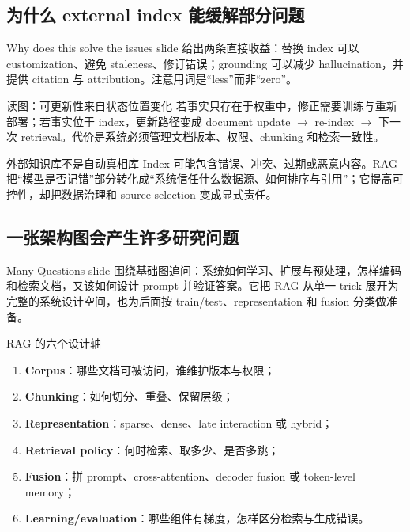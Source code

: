 \subsection{为什么 external index 能缓解部分问题}

Why does this solve the issues slide 给出两条直接收益：替换 index 可以 customization、避免 staleness、修订错误；grounding 可以减少 hallucination，并提供 citation 与 attribution。注意用词是“less”而非“zero”。


\begin{knowledgebox}{读图：可更新性来自状态位置变化}
若事实只存在于权重中，修正需要训练与重新部署；若事实位于 index，更新路径变成 document update $\rightarrow$ re-index $\rightarrow$ 下一次 retrieval。代价是系统必须管理文档版本、权限、chunking 和检索一致性。
\end{knowledgebox}

\begin{warningbox}{外部知识库不是自动真相库}
Index 可能包含错误、冲突、过期或恶意内容。RAG 把“模型是否记错”部分转化成“系统信任什么数据源、如何排序与引用”；它提高可控性，却把数据治理和 source selection 变成显式责任。
\end{warningbox}


\subsection{一张架构图会产生许多研究问题}

Many Questions slide 围绕基础图追问：系统如何学习、扩展与预处理，怎样编码和检索文档，又该如何设计 prompt 并验证答案。它把 RAG 从单一 trick 展开为完整的系统设计空间，也为后面按 train/test、representation 和 fusion 分类做准备。


\begin{importantbox}{RAG 的六个设计轴}
\begin{enumerate}
  \item \textbf{Corpus}：哪些文档可被访问，谁维护版本与权限；
  \item \textbf{Chunking}：如何切分、重叠、保留层级；
  \item \textbf{Representation}：sparse、dense、late interaction 或 hybrid；
  \item \textbf{Retrieval policy}：何时检索、取多少、是否多跳；
  \item \textbf{Fusion}：拼 prompt、cross-attention、decoder fusion 或 token-level memory；
  \item \textbf{Learning/evaluation}：哪些组件有梯度，怎样区分检索与生成错误。
\end{enumerate}
\end{importantbox}

